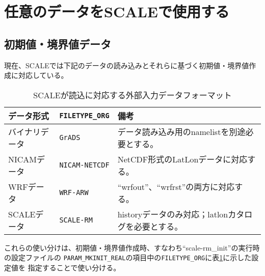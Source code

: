 \section{任意のデータをSCALEで使用する} \label{sec:adv_datainput}





\subsection{初期値・境界値データ} \label{sec:adv_bnddata}
現在、SCALEでは下記のデータの読み込みとそれらに基づく初期値・境界値作成に対応している。

\begin{table}[htb]
\begin{center}
\caption{SCALEが読込に対応する外部入力データフォーマット}
\begin{tabularx}{150mm}{|l|l|X|} \hline
 \rowcolor[gray]{0.9} データ形式 & \verb|FILETYPE_ORG| & 備考 \\ \hline
 バイナリデータ & \verb|GrADS| & データ読み込み用のnamelistを別途必要とする。 \\ \hline
 NICAMデータ &  \verb|NICAM-NETCDF| & NetCDF形式のLatLonデータに対応する。 \\ \hline
 WRFデータ &  \verb|WRF-ARW| & ``wrfout''、``wrfrst''の両方に対応する。 \\ \hline
 SCALEデータ &  \verb|SCALE-RM| & historyデータのみ対応；latlonカタログを必要とする。 \\ \hline
\end{tabularx}
\label{tab:inputdata_format}
\end{center}
\end{table}

これらの使い分けは、初期値・境界値作成時、すなわち``scale-rm\_init''の実行時の設定ファイルの
\verb|PARAM_MKINIT_REAL|の項目中の\verb|FILETYPE_ORG|に表\ref{tab:inputdata_format}に示した設定値を
指定することで使い分ける。

